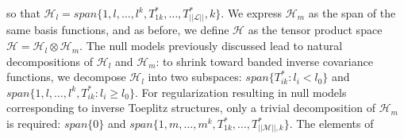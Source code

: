 \documentclass[12pt]{article}
\begin{document}
so that $\mathcal{H}_l = span\lbrace 1,l,\dots,l^k, T^*_{1k},\dots, T^*_{\vert \vert \mathcal{L} \vert \vert},k \rbrace$. We express $\mathcal{H}_m$ as the span of the same basis functions, and as before, we define $\mathcal{H}$ as the tensor product space $\mathcal{H} = \mathcal{H}_l \otimes \mathcal{H}_m$. The null models previously discussed lead to natural decompositions of $\mathcal{H}_l$ and $\mathcal{H}_m$: to shrink toward banded inverse covariance functions, we decompose $\mathcal{H}_l$ into two subspaces: $span\lbrace T^*_{ik}: l_i < l_0 \rbrace$ and $span\lbrace 1,l,\dots,l^k, T^*_{ik}: l_i \ge l_0 \rbrace$. For regularization resulting in null models corresponding to inverse Toeplitz structures, only a trivial decomposition of $\mathcal{H}_m$ is required: $span\lbrace 0 \rbrace$ and $span\lbrace 1,m,\dots,m^k,T^*_{1k},\dots,T^*_{\vert \vert \mathcal{M}\vert \vert,k} \rbrace$. The elements of 
%
%
%
%
%
%
\end{document}
